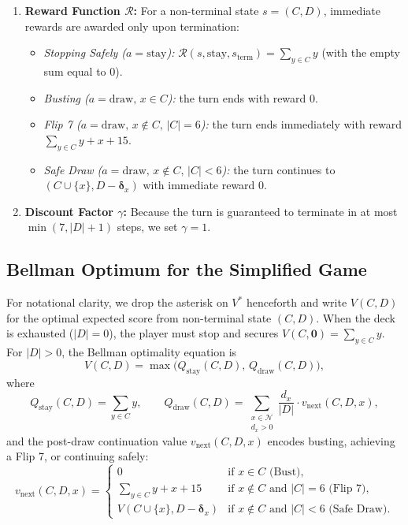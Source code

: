 \documentclass{article}
\theoremstyle{plain}
\theoremstyle{definition}
\theoremstyle{remark}
\begin{document}
\begin{enumerate}
    \item \textbf{Reward Function $\mathcal{R}$:} For a non-terminal state $s = (C, D)$, immediate rewards are awarded only upon termination:
    \begin{itemize}
        \item \textit{Stopping Safely ($a = \text{stay}$):} $\mathcal{R}(s, \text{stay}, s_{\text{term}}) = \sum_{y \in C} y$ (with the empty sum equal to $0$).
        \item \textit{Busting ($a = \text{draw},\, x \in C$):} the turn ends with reward $0$.
        \item \textit{Flip 7 ($a = \text{draw},\, x \notin C,\, |C| = 6$):} the turn ends immediately with reward $\sum_{y \in C} y + x + 15$.
        \item \textit{Safe Draw ($a = \text{draw},\, x \notin C,\, |C| < 6$):} the turn continues to $(C \cup \{x\}, D - \boldsymbol{\delta}_x)$ with immediate reward $0$.
    \end{itemize}

    \item \textbf{Discount Factor $\gamma$:} Because the turn is guaranteed to terminate in at most $\min(7, |D| + 1)$ steps, we set $\gamma = 1$.
\end{enumerate}

\subsection{Bellman Optimum for the Simplified Game}
For notational clarity, we drop the asterisk on $V^*$ henceforth and write $V(C, D)$ for the optimal expected score from non-terminal state $(C, D)$. When the deck is exhausted ($|D| = 0$), the player must stop and secures $V(C, \mathbf{0}) = \sum_{y \in C} y$. For $|D| > 0$, the Bellman optimality equation is
\[
    V(C, D) = \max \Big( Q_{\text{stay}}(C, D), \, Q_{\text{draw}}(C, D) \Big),
\]
where
\[
    Q_{\text{stay}}(C, D) = \sum_{y \in C} y, \qquad
    Q_{\text{draw}}(C, D) = \sum_{\substack{x \in \mathcal{N} \\ d_x > 0}} \frac{d_x}{|D|} \cdot v_{\text{next}}(C, D, x),
\]
and the post-draw continuation value $v_{\text{next}}(C, D, x)$ encodes busting, achieving a Flip 7, or continuing safely:
\[
    v_{\text{next}}(C, D, x) =
    \begin{cases}
        0 & \text{if } x \in C \text{ (Bust)}, \\
        \sum_{y \in C} y + x + 15 & \text{if } x \notin C \text{ and } |C| = 6 \text{ (Flip 7)}, \\
        V(C \cup \{x\}, D - \boldsymbol{\delta}_x) & \text{if } x \notin C \text{ and } |C| < 6 \text{ (Safe Draw)}.
    \end{cases}
\]
\end{document}

